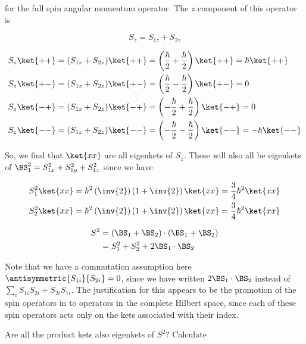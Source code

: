 for the full spin angular momentum operator.  The $z$ component of this operator is 

\begin{equation}\label{eqn:qmTwoL16:290}
S_z = S_{1z} + S_{2z}
\end{equation}

\begin{align}\label{eqn:qmTwoL16:310}
S_z\ket{++} &= (S_{1z} + S_{2z}) \ket{++} = \left( \frac{\hbar}{2} +\frac{\hbar}{2} \right) \ket{++} = \hbar \ket{++} \\ 
S_z\ket{+-} &= (S_{1z} + S_{2z}) \ket{+-} = \left( \frac{\hbar}{2} -\frac{\hbar}{2} \right) \ket{+-} = 0 \\
S_z\ket{-+} &= (S_{1z} + S_{2z}) \ket{-+} = \left( -\frac{\hbar}{2} +\frac{\hbar}{2} \right) \ket{-+} = 0 \\
S_z\ket{--} &= (S_{1z} + S_{2z}) \ket{--} = \left( -\frac{\hbar}{2} -\frac{\hbar}{2} \right) \ket{--} = -\hbar \ket{--} 
\end{align}

So, we find that $\ket{x x}$ are all eigenkets of $S_z$.  These will also all be eigenkets of $\BS_1^2 = S_{1x}^2 +S_{1y}^2 +S_{1z}^2$ since we have

\begin{align}\label{eqn:qmTwoL16:330}
S_1^2 \ket{x x} &= \hbar^2 \left(\inv{2}\right) \left(1 + \inv{2}\right) \ket{x x} = \frac{3}{4} \hbar^2 \ket{x x} \\
S_2^2 \ket{x x} &= \hbar^2 \left(\inv{2}\right) \left(1 + \inv{2}\right) \ket{x x} = \frac{3}{4} \hbar^2 \ket{x x} 
\end{align}

\begin{equation}\label{eqn:qmTwoL16:350}
\begin{aligned}
S^2 &= 
(\BS_1
+\BS_2) 
\cdot
(\BS_1
+\BS_2)  \\
&= 
S_1^2 + S_2^2 + 2 \BS_1 \cdot \BS_2
\end{aligned}
\end{equation}

Note that we have a commutation assumption here $\antisymmetric{S_{1i}}{S_{2i}} = 0$, since we have written $2 \BS_1 \cdot \BS_2$ instead of $\sum_i S_{1i}S_{2i} + S_{2i}S_{1i}$.  The justification for this appears to be the promotion of the spin operators in  to operators in the complete Hilbert space, since each of these spin operators acts only on the kets associated with their index.

Are all the product kets also eigenkets of $S^2$?  Calculate

